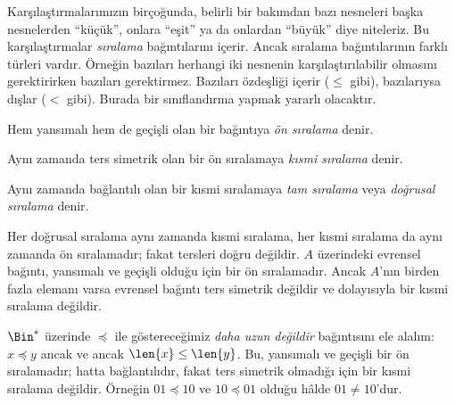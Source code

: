 


\begin{explain}
Karşılaştırmalarımızın birçoğunda, belirli bir bakımdan bazı nesneleri başka
nesnelerden ``küçük'', onlara ``eşit'' ya da onlardan ``büyük'' diye niteleriz.
Bu karşılaştırmalar \emph{sıralama} bağıntılarını içerir. Ancak sıralama
bağıntılarının farklı türleri vardır. Örneğin bazıları herhangi iki nesnenin
karşılaştırılabilir olmasını gerektirirken bazıları gerektirmez. Bazıları
özdeşliği içerir ($\le$ gibi), bazılarıysa dışlar ($<$ gibi). Burada bir
sınıflandırma yapmak yararlı olacaktır.
\end{explain}

\begin{defn}[Ön sıralama]
Hem yansımalı hem de geçişli olan bir bağıntıya \emph{ön sıralama} denir.
\end{defn}

\begin{defn}
Aynı zamanda ters simetrik olan bir ön sıralamaya \emph{kısmi sıralama} denir.
\end{defn}

\begin{defn}
Aynı zamanda bağlantılı olan bir kısmi sıralamaya \emph{tam sıralama} veya
\emph{doğrusal sıralama} denir.
\end{defn}

\begin{ex}
Her doğrusal sıralama aynı zamanda kısmi sıralama, her kısmi sıralama da aynı
zamanda ön sıralamadır; fakat tersleri doğru değildir. $A$ üzerindeki evrensel
bağıntı, yansımalı ve geçişli olduğu için bir ön sıralamadır. Ancak $A$'nın
birden fazla elemanı varsa evrensel bağıntı ters simetrik değildir ve dolayısıyla
bir kısmi sıralama değildir.
\end{ex}

\begin{ex}
$\Bin^*$ üzerinde $\preccurlyeq$ ile göstereceğimiz \emph{daha uzun değildir}
bağıntısını ele alalım: $x \preccurlyeq y$ ancak ve ancak $\len{x} \le \len{y}$. Bu, yansımalı
ve geçişli bir ön sıralamadır; hatta bağlantılıdır, fakat ters simetrik olmadığı
için bir kısmi sıralama değildir. Örneğin $01 \preccurlyeq 10$ ve
$10 \preccurlyeq 01$ olduğu hâlde $01 \neq 10$'dur.
\end{ex}

